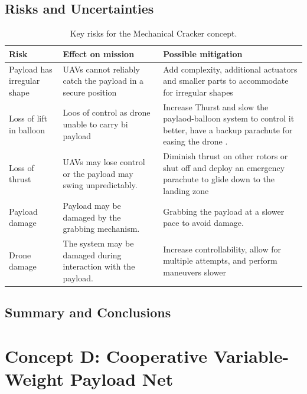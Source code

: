 \subsection{Risks and Uncertainties}
\begin{table}[H]
\centering
\small
\caption{Key risks for the Mechanical Cracker concept.}
\label{tab:conceptD_key_risks}
\begin{tabularx}{\textwidth}{p{} X p{}}
\toprule
\textbf{Risk} & \textbf{Effect on mission} & \textbf{Possible mitigation} \\
\midrule
Payload has irregular shape  & UAVs cannot reliably catch the payload in a secure position & Add complexity, additional actuators and smaller parts to accommodate for irregular shapes\\
Loss of lift in  balloon & Loos of control as drone unable to carry bi payload  & Increase Thurst and slow the paylaod-balloon system to control it better, have a backup parachute for easing the drone . \\
Loss of thrust  & UAVs may lose control or the payload may swing unpredictably. & Diminish  thrust on other rotors or shut off and deploy an emergency parachute to glide down to the landing zone \\
Payload damage & Payload may be damaged by the grabbing mechanism. & Grabbing the payload at a slower pace to avoid damage. \\
Drone damage & The system may be damaged during interaction with the payload. & Increase controllability, allow for multiple attempts, and perform maneuvers slower \\

\bottomrule
\end{tabularx}
\end{table}
\subsection{Summary and Conclusions}








\section{Concept D: Cooperative Variable-Weight Payload Net}




